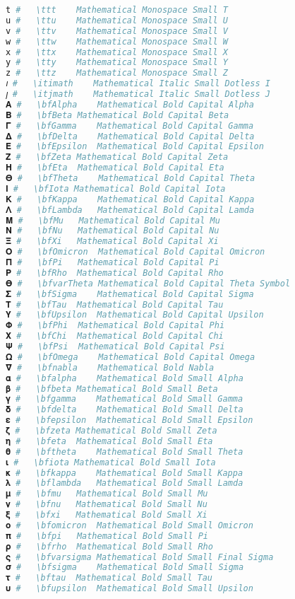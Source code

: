 \begin{lstlisting}[language=Julia]
𝚝 #   \ttt    Mathematical Monospace Small T
𝚞 #   \ttu    Mathematical Monospace Small U
𝚟 #   \ttv    Mathematical Monospace Small V
𝚠 #   \ttw    Mathematical Monospace Small W
𝚡 #   \ttx    Mathematical Monospace Small X
𝚢 #   \tty    Mathematical Monospace Small Y
𝚣 #   \ttz    Mathematical Monospace Small Z
𝚤 #   \itimath    Mathematical Italic Small Dotless I
𝚥 #   \itjmath    Mathematical Italic Small Dotless J
𝚨 #   \bfAlpha    Mathematical Bold Capital Alpha
𝚩 #   \bfBeta Mathematical Bold Capital Beta
𝚪 #   \bfGamma    Mathematical Bold Capital Gamma
𝚫 #   \bfDelta    Mathematical Bold Capital Delta
𝚬 #   \bfEpsilon  Mathematical Bold Capital Epsilon
𝚭 #   \bfZeta Mathematical Bold Capital Zeta
𝚮 #   \bfEta  Mathematical Bold Capital Eta
𝚯 #   \bfTheta    Mathematical Bold Capital Theta
𝚰 #   \bfIota Mathematical Bold Capital Iota
𝚱 #   \bfKappa    Mathematical Bold Capital Kappa
𝚲 #   \bfLambda   Mathematical Bold Capital Lamda
𝚳 #   \bfMu   Mathematical Bold Capital Mu
𝚴 #   \bfNu   Mathematical Bold Capital Nu
𝚵 #   \bfXi   Mathematical Bold Capital Xi
𝚶 #   \bfOmicron  Mathematical Bold Capital Omicron
𝚷 #   \bfPi   Mathematical Bold Capital Pi
𝚸 #   \bfRho  Mathematical Bold Capital Rho
𝚹 #   \bfvarTheta Mathematical Bold Capital Theta Symbol
𝚺 #   \bfSigma    Mathematical Bold Capital Sigma
𝚻 #   \bfTau  Mathematical Bold Capital Tau
𝚼 #   \bfUpsilon  Mathematical Bold Capital Upsilon
𝚽 #   \bfPhi  Mathematical Bold Capital Phi
𝚾 #   \bfChi  Mathematical Bold Capital Chi
𝚿 #   \bfPsi  Mathematical Bold Capital Psi
𝛀 #   \bfOmega    Mathematical Bold Capital Omega
𝛁 #   \bfnabla    Mathematical Bold Nabla
𝛂 #   \bfalpha    Mathematical Bold Small Alpha
𝛃 #   \bfbeta Mathematical Bold Small Beta
𝛄 #   \bfgamma    Mathematical Bold Small Gamma
𝛅 #   \bfdelta    Mathematical Bold Small Delta
𝛆 #   \bfepsilon  Mathematical Bold Small Epsilon
𝛇 #   \bfzeta Mathematical Bold Small Zeta
𝛈 #   \bfeta  Mathematical Bold Small Eta
𝛉 #   \bftheta    Mathematical Bold Small Theta
𝛊 #   \bfiota Mathematical Bold Small Iota
𝛋 #   \bfkappa    Mathematical Bold Small Kappa
𝛌 #   \bflambda   Mathematical Bold Small Lamda
𝛍 #   \bfmu   Mathematical Bold Small Mu
𝛎 #   \bfnu   Mathematical Bold Small Nu
𝛏 #   \bfxi   Mathematical Bold Small Xi
𝛐 #   \bfomicron  Mathematical Bold Small Omicron
𝛑 #   \bfpi   Mathematical Bold Small Pi
𝛒 #   \bfrho  Mathematical Bold Small Rho
𝛓 #   \bfvarsigma Mathematical Bold Small Final Sigma
𝛔 #   \bfsigma    Mathematical Bold Small Sigma
𝛕 #   \bftau  Mathematical Bold Small Tau
𝛖 #   \bfupsilon  Mathematical Bold Small Upsilon

\end{lstlisting}
